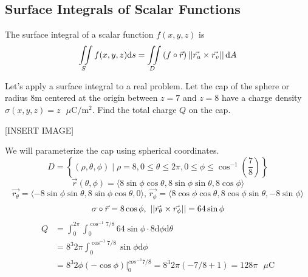 \subsection{Surface Integrals of Scalar Functions}
\begin{definition}
	The surface integral of a scalar function $f(x,y,z)$ is
	\begin{equation*}
		\iint\limits_{S}{f(x,y,z)\mathrm{d}s} = \iint\limits_{D}{(f\circ\vec{r})\left|\left|\vec{r_u} \times \vec{r_v}\right|\right|\mathrm{d}A}
	\end{equation*}
\end{definition}

\noindent
Let’s apply a surface integral to a real problem. Let the cap of the sphere or radius $8\text{m}$ centered at the origin between $z = 7$ and $z = 8$ have a charge density $\sigma(x,y,z) = z \text{ } \mu \text{C}/ \text{m}^2$. Find the total charge $Q$ on the cap.

[INSERT IMAGE]

\noindent
We will parameterize the cap using spherical coordinates.
\begin{equation*}
	D = \left\{(\rho, \theta, \phi) \mid \rho=8, 0 \leq \theta \leq 2\pi, 0 \leq \phi \leq \cos^{-1}{\left(\frac{7}{8}\right)}\right\}
\end{equation*}
\begin{equation*}
	\vec{r}(\theta,\phi) = \langle 8\sin{\phi}\cos{\theta}, 8\sin{\phi}\sin{\theta}, 8\cos{\phi}\rangle
\end{equation*}
\begin{equation*}
	\vec{r_\theta} = \langle -8\sin{\phi}\sin{\theta}, 8\sin{\phi}\cos{\theta}, 0\rangle \text{, }
	\vec{r_\phi} = \langle 8\cos{\phi}\cos{\theta}, 8\cos{\phi}\sin{\theta}, -8\sin{\phi}\rangle
\end{equation*}
\begin{equation*}
	\sigma\circ\vec{r} = 8\cos{\phi} \text{, }
	\left|\left|\vec{r_\theta} \times \vec{r_\phi}\right|\right| = 64\sin{\phi}	
\end{equation*}
\begin{align*}
	Q &= \int_{0}^{2\pi}{\int_{0}^{\cos^{-1}{7/8}}{64\sin{\phi} \cdot8 \mathrm{d}\phi\mathrm{d}\theta}} \\
	& = 8^3 2\pi \int_{0}^{\cos^{-1}{7/8}}{\sin{\phi}\mathrm{d}\phi} \\
	&= 8^3 2\phi(-\cos{\phi})\rvert_{0}^{cos^{-1}{7/8}} = 8^3 2\pi\left(-7/8 + 1\right) = 128\pi\text{ }\mu\text{C}
\end{align*}